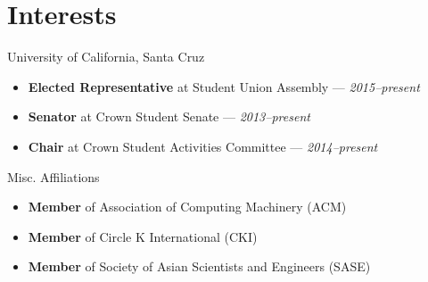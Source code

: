 \documentclass[11pt]{article}
\begin{document}
\section*{Interests}
\begin{description}
  \itemsep0pt \parskip0pt
  \item[Student Government] University of California, Santa Cruz
    \begin{itemize}
      \itemsep0pt \parskip0pt
      \item \textbf{Elected Representative} at Student Union Assembly ---
        \textit{2015--present}
      \item \textbf{Senator} at Crown Student Senate --- \textit{2013--present}
      \item \textbf{Chair} at Crown Student Activities Committee ---
        \textit{2014--present}
    \end{itemize}
  \item[Organizations] Misc. Affiliations
    \begin{itemize}
      \item \textbf{Member} of Association of Computing Machinery (ACM)
      \item \textbf{Member} of Circle K International (CKI)
      \item \textbf{Member} of Society of Asian Scientists and Engineers (SASE)
    \end{itemize}
\end{description}
\end{document}
